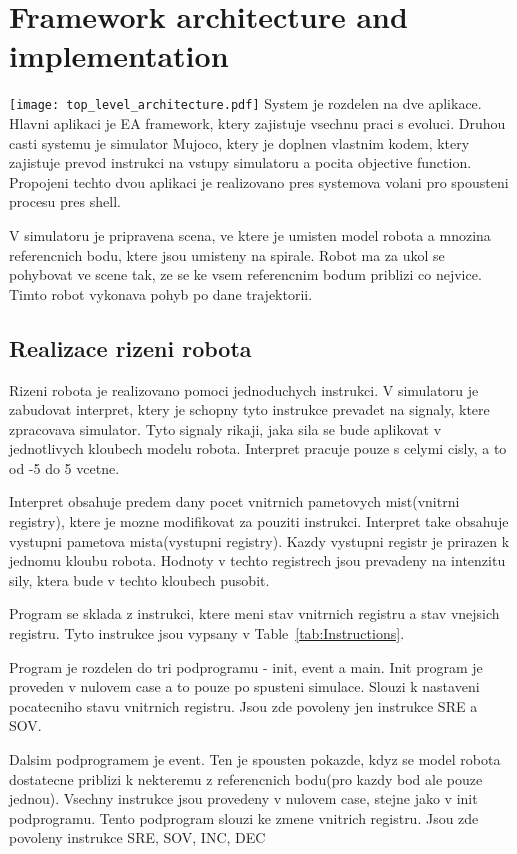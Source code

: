 \documentclass{ExcelAtFIT}
\begin{document}
\section{Framework architecture and implementation}
\label{sec:ArchitectureAndImplementation}
{\texttt{[image: top\_level\_architecture.pdf]}
System je rozdelen na dve aplikace.
Hlavni aplikaci je EA framework, ktery zajistuje vsechnu praci s evoluci.
Druhou casti systemu je simulator Mujoco, ktery je doplnen vlastnim kodem, ktery zajistuje prevod instrukci na vstupy simulatoru a pocita objective function.
Propojeni techto dvou aplikaci je realizovano pres systemova volani pro spousteni procesu pres shell.

V simulatoru je pripravena scena, ve ktere je umisten model robota a mnozina referencnich bodu, ktere jsou umisteny na spirale.
Robot ma za ukol se pohybovat ve scene tak, ze se ke vsem referencnim bodum priblizi co nejvice.
Timto robot vykonava pohyb po dane trajektorii.

\subsection{Realizace rizeni robota}
Rizeni robota je realizovano pomoci jednoduchych instrukci.
V simulatoru je zabudovat interpret, ktery je schopny tyto instrukce prevadet na signaly, ktere zpracovava simulator.
Tyto signaly rikaji, jaka sila se bude aplikovat v jednotlivych kloubech modelu robota.
Interpret pracuje pouze s celymi cisly, a to od -5 do 5 vcetne.

Interpret obsahuje predem dany pocet vnitrnich pametovych mist(vnitrni registry), ktere je mozne modifikovat za pouziti instrukci.
Interpret take obsahuje vystupni pametova mista(vystupni registry).
Kazdy vystupni registr je prirazen k jednomu kloubu robota.
Hodnoty v techto registrech jsou prevadeny na intenzitu sily, ktera bude v techto kloubech pusobit.

Program se sklada z instrukci, ktere meni stav vnitrnich registru a stav vnejsich registru.
Tyto instrukce jsou vypsany v Table~\ref{tab:Instructions}.

Program je rozdelen do tri podprogramu - init, event a main.
Init program je proveden v nulovem case a to pouze po spusteni simulace.
Slouzi k nastaveni pocatecniho stavu vnitrnich registru. Jsou zde povoleny jen instrukce SRE a SOV\@.

Dalsim podprogramem je event.
Ten je spousten pokazde, kdyz se model robota dostatecne priblizi k nekteremu z referencnich bodu(pro kazdy bod ale pouze jednou).
Vsechny instrukce jsou provedeny v nulovem case, stejne jako v init podprogramu.
Tento podprogram slouzi ke zmene vnitrich registru.
Jsou zde povoleny instrukce SRE, SOV, INC, DEC

}
\end{document}
